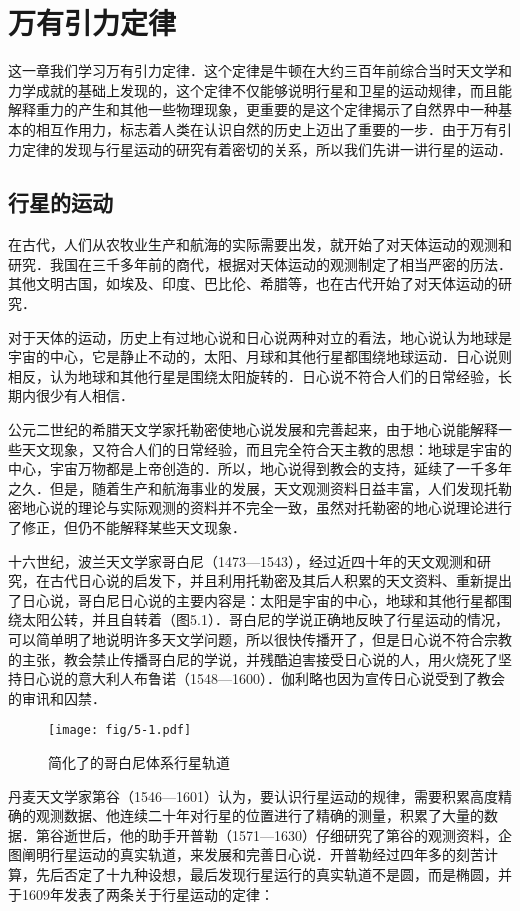 
	

\chapter{万有引力定律}
这一章我们学习万有引力定律．这个定律是牛顿在大约三百年前综合当时天文学和力学成就的基础上发现的，这个定律不仅能够说明行星和卫星的运动规律，而且能解释重力的产生和其他一些物理现象，更重要的是这个定律揭示了自然界中一种基本的相互作用力，标志着人类在认识自然的历史上迈出了重要的一步．由于万有引力定律的发现与行星运动的研究有着密切的关系，所以我们先讲一讲行星的运动．

\section{行星的运动}
在古代，人们从农牧业生产和航海的实际需要出发，就开始了对天体运动的观测和研究．我国在三千多年前的商代，根据对天体运动的观测制定了相当严密的历法．其他文明古国，如埃及、印度、巴比伦、希腊等，也在古代开始了对天体运动的研究．

对于天体的运动，历史上有过地心说和日心说两种对立的看法，地心说认为地球是宇宙的中心，它是静止不动的，太阳、月球和其他行星都围绕地球运动．日心说则相反，认为地球和其他行星是围绕太阳旋转的．日心说不符合人们的日常经验，长期内很少有人相信．	
	
公元二世纪的希腊天文学家托勒密使地心说发展和完善起来，由于地心说能解释一些天文现象，又符合人们的日常经验，而且完全符合天主教的思想：地球是宇宙的中心，宇宙万物都是上帝创造的．所以，地心说得到教会的支持，延续了一千多年之久．但是，随着生产和航海事业的发展，天文观测资料日益丰富，人们发现托勒密地心说的理论与实际观测的资料并不完全一致，虽然对托勒密的地心说理论进行了修正，但仍不能解释某些天文现象．

十六世纪，波兰天文学家哥白尼（1473—1543），经过近四十年的天文观测和研究，在古代日心说的启发下，并且利用托勒密及其后人积累的天文资料、重新提出了日心说，哥白尼日心说的主要内容是：太阳是宇宙的中心，地球和其他行星都围绕太阳公转，并且自转着（图5.1）．哥白尼的学说正确地反映了行星运动的情况，可以简单明了地说明许多天文学问题，所以很快传播开了，但是日心说不符合宗教的主张，教会禁止传播哥白尼的学说，并残酷迫害接受日心说的人，用火烧死了坚持日心说的意大利人布鲁诺（1548—1600）．伽利略也因为宣传日心说受到了教会的审讯和囚禁．
\begin{figure}\centering
\texttt{[image: fig/5-1.pdf]}
\caption{简化了的哥白尼体系行星轨道}
\end{figure}

丹麦天文学家第谷（1546—1601）认为，要认识行星运动的规律，需要积累高度精确的观测数据、他连续二十年对行星的位置进行了精确的测量，积累了大量的数据．第谷逝世后，他的助手开普勒（1571—1630）仔细研究了第谷的观测资料，企图阐明行星运动的真实轨道，来发展和完善日心说．开普勒经过四年多的刻苦计算，先后否定了十九种设想，最后发现行星运行的真实轨道不是圆，而是椭圆，并于1609年发表了两条关于行星运动的定律：

